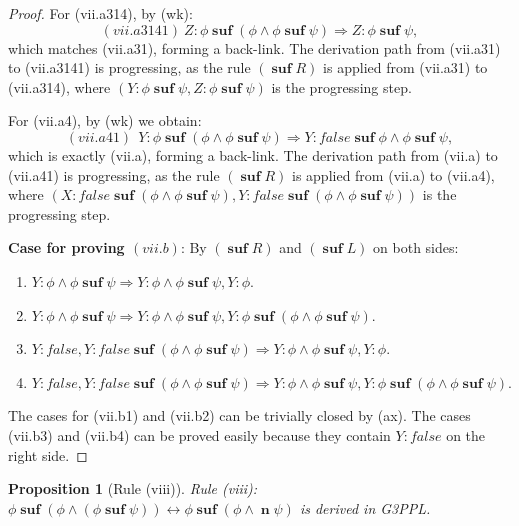 \documentclass[manuscript,screen]{acmart}
\newtheorem{prop}{Proposition}[section]
\newcommand{\false}[0]{\mathit{false}}
\newcommand{\GiiiPPLcyc}[0]{\mbox{G3PPL}}
\DeclareMathOperator{\osuf}{\mathbf{suf}}
\DeclareMathOperator{\nxt}{\mathbf{n}}
\begin{document}
\begin{proof}
For (vii.a314), by (wk):
$$
(vii.a3141)\ Z : \phi\osuf(\phi\wedge \phi\osuf\psi)\Rightarrow Z : \phi\osuf\psi, 
$$
which matches (vii.a31), forming a back-link. 
The derivation path from (vii.a31) to (vii.a3141) is progressing, as the rule $(\osuf R)$ is applied from (vii.a31) to (vii.a314), where $(Y : \phi\osuf\psi, Z : \phi\osuf\psi)$ is the progressing step. 

For (vii.a4), by (wk) we obtain:
$$
(vii.a41)\ \ Y : \phi\osuf (\phi\wedge \phi\osuf \psi)\Rightarrow Y:\false\osuf \phi\wedge\phi\osuf \psi, 
$$
which is exactly (vii.a), forming a back-link. The derivation path from (vii.a) to (vii.a41) is progressing, as the rule $(\osuf R)$ is applied from (vii.a) to (vii.a4), where $(X : \false \osuf(\phi\wedge \phi\osuf\psi), Y : \false \osuf(\phi\wedge \phi\osuf\psi))$ is the progressing step. 

\textbf{Case for proving $(vii.b)$}:
By $(\osuf R)$ and $(\osuf L)$ on both sides: 
\begin{enumerate}
\item[(vii.b1)] $Y : \phi\wedge \phi\osuf \psi\Rightarrow Y : \phi\wedge \phi\osuf \psi, Y : \phi$. 
\item[(vii.b2)] $Y : \phi\wedge \phi\osuf \psi\Rightarrow Y : \phi\wedge \phi\osuf \psi, Y : \phi\osuf (\phi\wedge \phi\osuf \psi)$. 
\item[(vii.b3)] $Y : \false, Y : \false\osuf (\phi\wedge\phi\osuf\psi)\Rightarrow Y : \phi\wedge \phi\osuf \psi, Y : \phi$. 
\item[(vii.b4)] $Y : \false, Y : \false\osuf (\phi\wedge\phi\osuf\psi)\Rightarrow Y : \phi\wedge \phi\osuf \psi, Y : \phi\osuf(\phi\wedge \phi\osuf\psi)$. 
\end{enumerate}
The cases for (vii.b1) and (vii.b2) can be trivially closed by (ax). 
The cases (vii.b3) and (vii.b4) can be proved easily because they contain $Y : \false$ on the right side. 


\end{proof}


\begin{prop}[Rule (viii)]
Rule (viii): 
 $\phi\osuf(\phi\wedge (\phi\osuf \psi))\leftrightarrow \phi\osuf(\phi\wedge \nxt \psi)$
is derived in \GiiiPPLcyc. 
\end{prop}
\end{document}

